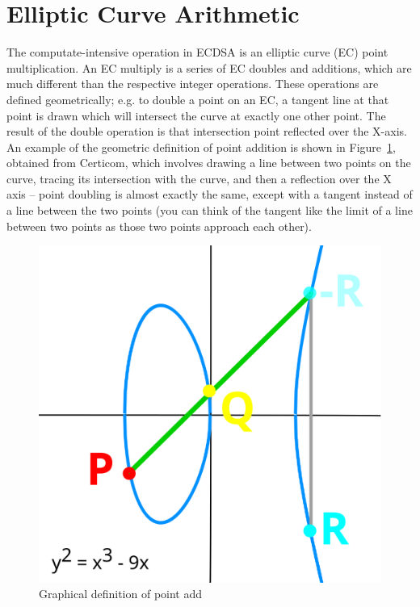 \documentclass[twocolumn]{article}
\begin{document}
\section{Elliptic Curve Arithmetic}

The computate-intensive operation in ECDSA is an elliptic curve (EC)
point multiplication. An EC multiply is a series of EC doubles and
additions, which are much different than the respective integer
operations. These operations are defined geometrically; e.g. to double
a point on an EC, a tangent line at that point is drawn which will
intersect the curve at exactly one other point. The result of the
double operation is that intersection point reflected over the X-axis.
An example of the geometric definition of point addition is shown in
Figure~\ref{point-add-graph}, obtained from Certicom, which involves 
drawing a line between two points on the curve, tracing its intersection with the curve, and then a reflection over the X axis -- point doubling is almost exactly
the same, except with a tangent instead of a line between the two
points (you can think of the tangent like the limit of a line between
two points as those two points approach each other).

\begin{figure}[ht]
  \begin{center}
    \includegraphics[width=0.9\linewidth]{point_add.svg}
  \end{center}

  \caption{Graphical definition of point add
    \label{point-add-graph}}
\end{figure}
\end{document}
